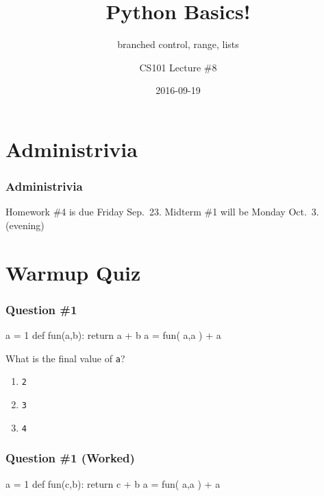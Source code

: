 \documentclass[11pt]{beamer}
\title{Python Basics!}
\subtitle{branched control, range, lists}
\author{CS101 Lecture \#8}
\date{2016-09-19}
\begin{document}
  \setcounter{showProgressBar}{0}
  \setcounter{showSlideNumbers}{0}

\frame{\titlepage}

\setcounter{framenumber}{0}
\setcounter{showProgressBar}{1}
\setcounter{showSlideNumbers}{1}

\section{Administrivia}

\begin{frame}
  \frametitle{Administrivia}
  \Enlarge
  \begin{itemize}
  \myitem  Homework \#4 is due Friday Sep.\ 23.
  \myitem  Midterm \#1 will be Monday Oct.\ 3.  (evening)
  \end{itemize}
\end{frame}

\section{Warmup Quiz}

\begin{frame}[fragile]
  \frametitle{Question \#1}
  \Enlarge

  \begin{semiverbatim}
a = 1
def fun(a,b):
    return a + b
a = fun( a,a ) + a
  \end{semiverbatim}
  What is the final value of \texttt{a}?
  \begin{enumerate}[label=\Alph*]
  \item  \texttt{2}
  \item  \texttt{3}
  \item  \texttt{4}
  \end{enumerate}
\end{frame}

\begin{frame}[fragile]
  \frametitle{Question \#1 (Worked)}
  \Enlarge

  \begin{semiverbatim}
a = 1
def fun(c,b):
    return c + b
a = fun( a,a ) + a
  \end{semiverbatim}
\end{frame}
\end{document}
